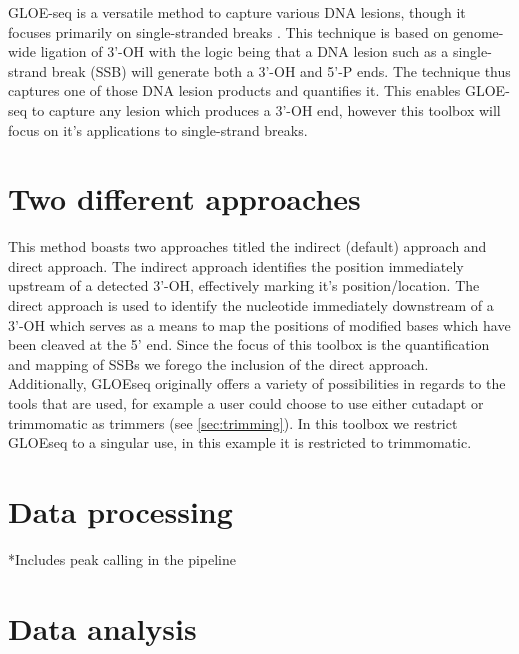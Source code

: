 \label{chap:GLOEseq}
GLOE-seq is a versatile method to capture various DNA lesions, though it focuses primarily on single-stranded breaks \cite{GLOEseq}. This technique is based on genome-wide ligation of 3'-OH with the logic being that a DNA lesion such as a single-strand break (SSB) will generate both a 3'-OH and 5'-P ends. The technique thus captures one of those DNA lesion products and quantifies it. This enables GLOE-seq to capture any lesion which produces a 3'-OH end, however this toolbox will focus on it's applications to single-strand breaks.

\section{Two different approaches \label{GLOEseq_direct_indirect}}
This method boasts two approaches titled the indirect (default) approach and direct approach. The indirect approach identifies the position immediately upstream of a detected 3'-OH, effectively marking it's position/location. The direct approach is used to identify the nucleotide immediately downstream of a 3'-OH which serves as a means to map the positions of modified bases which have been cleaved at the 5' end. Since the focus of this toolbox is the quantification and mapping of SSBs we forego the inclusion of the direct approach.\\
Additionally, GLOEseq originally offers a variety of possibilities in regards to the tools that are used, for example a user could choose to use either cutadapt or trimmomatic as trimmers (see \autoref{sec:trimming}). In this toolbox we restrict GLOEseq to a singular use, in this example it is restricted to trimmomatic.

\section{Data processing \label{GLOEseq_data_processing}}
*Includes peak calling in the pipeline

\section{Data analysis \label{GLOEseq_data_analysis}}
